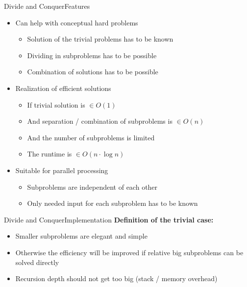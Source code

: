 \begin{frame}{Divide and Conquer}{Features}
  \begin{itemize}
    \item<2->
      Can help with conceptual hard problems
      \begin{itemize}
        \item<3->
          {\color{Mittel-Blau}Solution} of the trivial problems has to be known
        \item<4->
          {\color{Mittel-Blau}Dividing} in subproblems has to be possible
        \item<5->
          {\color{Mittel-Blau}Combination} of solutions has to be possible
      \end{itemize}
    \item<6->
      Realization of {\color{Mittel-Blau}efficient solutions}
      \begin{itemize}
        \item<7->
          If trivial solution is {\color{Mittel-Blau}$\in O(1)$}
        \item<8->
          And separation / combination of subproblems is {\color{Mittel-Blau}$\in O(n)$}
        \item<9->
          And the number of subproblems is limited
        \item<10->
          The runtime is {\color{Mittel-Blau}$\in O(n \cdot \log n)$}
      \end{itemize}
       \item<11->
      Suitable for parallel processing
      \begin{itemize}
        \item<12->
          Subproblems are {\color{Mittel-Blau}independent} of each other
        \item<13->
          Only needed input for each subproblem has to be known
      \end{itemize}
  \end{itemize}
\end{frame}


\begin{frame}{Divide and Conquer}{Implementation}
  \textbf{Definition of the trivial case:}
  \begin{itemize}
    \item<2->
      Smaller subproblems are elegant and simple
    \item<3->
      Otherwise the efficiency will be improved if relative big subproblems
      can be solved directly
    \item<4->
      Recursion depth should not get too big (stack / memory overhead)
  \end{itemize}
\end{frame}

